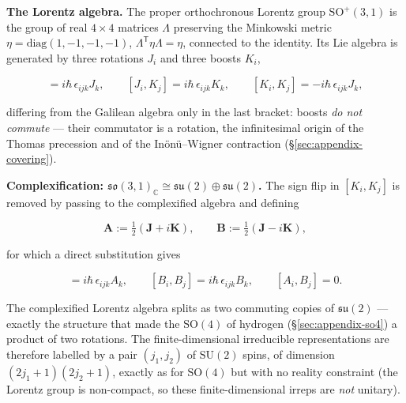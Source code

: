 \medskip\noindent\textbf{The Lorentz algebra.} The proper orthochronous Lorentz group $\mathrm{SO}^{+}(3,1)$ is the group of real $4\times4$ matrices $\Lambda$ preserving the Minkowski metric $\eta=\mathrm{diag}(1,-1,-1,-1)$, $\Lambda^{\mathsf T}\eta\Lambda=\eta$, connected to the identity. Its Lie algebra is generated by three rotations $J_{i}$ and three boosts $K_{i}$,
\begin{linenomath}
\begin{equation}
[J_{i},J_{j}]=i\hbar\,\epsilon_{ijk}J_{k},\qquad
[J_{i},K_{j}]=i\hbar\,\epsilon_{ijk}K_{k},\qquad
[K_{i},K_{j}]=-i\hbar\,\epsilon_{ijk}J_{k},
\label{eq:lorentz-algebra}
\end{equation}
\end{linenomath}
differing from the Galilean algebra only in the last bracket: boosts \emph{do not commute} --- their commutator is a rotation, the infinitesimal origin of the Thomas precession and of the In\"on\"u--Wigner contraction (\S\ref{sec:appendix-covering}).

\medskip\noindent\textbf{Complexification: $\mathfrak{so}(3,1)_{\mathbb C}\cong\mathfrak{su}(2)\oplus\mathfrak{su}(2)$.} The sign flip in $[K_{i},K_{j}]$ is removed by passing to the complexified algebra and defining
\begin{linenomath}
\begin{equation}
\bm A:=\tfrac12(\bm J+i\bm K),\qquad \bm B:=\tfrac12(\bm J-i\bm K),
\label{eq:lorentz-complexify}
\end{equation}
\end{linenomath}
for which a direct substitution gives
\begin{linenomath}
\begin{equation}
[A_{i},A_{j}]=i\hbar\,\epsilon_{ijk}A_{k},\qquad
[B_{i},B_{j}]=i\hbar\,\epsilon_{ijk}B_{k},\qquad
[A_{i},B_{j}]=0.
\end{equation}
\end{linenomath}
The complexified Lorentz algebra splits as two commuting copies of $\mathfrak{su}(2)$ --- exactly the structure that made the $\mathrm{SO}(4)$ of hydrogen (\S\ref{sec:appendix-so4}) a product of two rotations. The finite-dimensional irreducible representations are therefore labelled by a pair $(j_{1},j_{2})$ of $\mathrm{SU}(2)$ spins, of dimension $(2j_{1}+1)(2j_{2}+1)$, exactly as for $\mathrm{SO}(4)$ but with no reality constraint (the Lorentz group is non-compact, so these finite-dimensional irreps are \emph{not} unitary).

